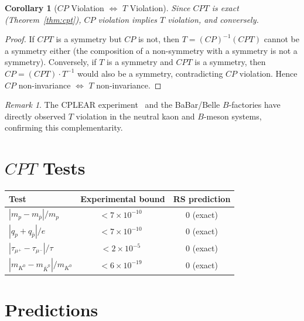\documentclass[12pt,a4paper]{article}
\newtheorem{corollary}[theorem]{Corollary}
\theoremstyle{definition}
\theoremstyle{remark}
\newtheorem{remark}[theorem]{Remark}
\begin{document}
\begin{corollary}[$CP$ Violation $\Leftrightarrow$ $T$ Violation]
\label{cor:cp-t}
Since $CPT$ is exact (Theorem~\ref{thm:cpt}), $CP$ violation implies
$T$ violation, and conversely.
\end{corollary}

\begin{proof}
If $CPT$ is a symmetry but $CP$ is not, then $T = (CP)^{-1}(CPT)$
cannot be a symmetry either (the composition of a non-symmetry with a
symmetry is not a symmetry).  Conversely, if $T$ is a symmetry and
$CPT$ is a symmetry, then $CP = (CPT) \cdot T^{-1}$ would also be a
symmetry, contradicting $CP$ violation.  Hence $CP$ non-invariance
$\Leftrightarrow$ $T$ non-invariance.
\end{proof}

\begin{remark}
The CPLEAR experiment~\cite{CPLEAR1998} and the BaBar/Belle
$B$-factories have directly observed $T$ violation in the neutral
kaon and $B$-meson systems, confirming this complementarity.
\end{remark}

\section{$CPT$ Tests}
\label{sec:tests}

\begin{center}
\renewcommand{\arraystretch}{1.3}
\begin{tabular}{lcc}
\toprule
\textbf{Test} & \textbf{Experimental bound} & \textbf{RS prediction} \\
\midrule
$|m_p - m_{\bar{p}}|/m_p$ & $< 7 \times 10^{-10}$~\cite{PDG2024} &
  0 (exact) \\
$|q_p + q_{\bar{p}}|/e$ & $< 7 \times 10^{-10}$~\cite{PDG2024} &
  0 (exact) \\
$|\tau_{\mu^+} - \tau_{\mu^-}|/\tau$ & $< 2 \times 10^{-5}$~\cite{PDG2024} &
  0 (exact) \\
$|m_{K^0} - m_{\bar{K}^0}|/m_{K^0}$ &
  $< 6 \times 10^{-19}$~\cite{PDG2024} & 0 (exact) \\
\bottomrule
\end{tabular}
\end{center}

\section{Predictions}
\label{sec:predictions}
\end{document}
